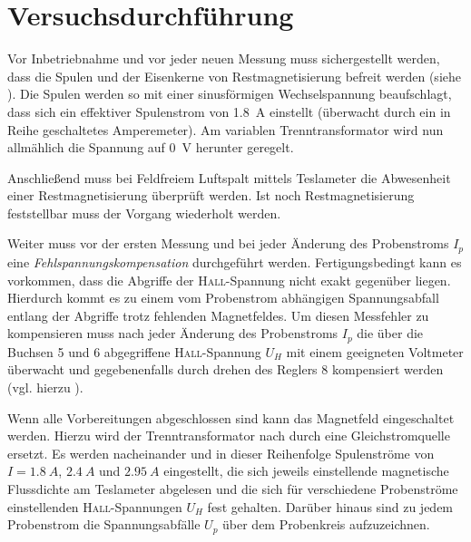 \chapter{Versuchsdurchführung}
Vor Inbetriebnahme und vor jeder neuen Messung muss sichergestellt werden, dass die Spulen und der Eisenkerne von
Restmagnetisierung befreit werden (siehe ). Die Spulen werden so mit einer sinusförmigen Wechselspannung beaufschlagt, dass sich
ein effektiver Spulenstrom von \SI{1,8}{A} einstellt (überwacht durch ein in Reihe geschaltetes Amperemeter). Am
variablen Trenntransformator wird nun allmählich die Spannung auf \SI{0}{V} herunter geregelt.
\par
Anschließend muss bei Feldfreiem Luftspalt mittels Teslameter die Abwesenheit einer Restmagnetisierung überprüft werden.
Ist noch Restmagnetisierung feststellbar muss der Vorgang wiederholt werden.
\par\medskip
Weiter muss vor der ersten Messung und bei jeder Änderung des Probenstroms \(I_p\) eine \textit{Fehlspannungskompensation}
durchgeführt werden. Fertigungsbedingt kann es vorkommen, dass die Abgriffe der \textsc{Hall}-Spannung nicht exakt gegenüber
liegen. Hierdurch kommt es zu einem vom Probenstrom abhängigen Spannungsabfall entlang der Abgriffe trotz fehlenden Magnetfeldes.
Um diesen Messfehler zu kompensieren muss nach jeder Änderung des Probenstroms \(I_p\) die über die Buchsen 5 und 6 abgegriffene
\textsc{Hall}-Spannung $U_H$ mit einem geeigneten Voltmeter überwacht und gegebenenfalls durch drehen des Reglers 8 kompensiert
werden (vgl. hierzu ).
\par\medskip
Wenn alle Vorbereitungen abgeschlossen sind kann das Magnetfeld eingeschaltet werden. Hierzu wird der Trenntransformator
nach  durch eine Gleichstromquelle ersetzt. Es werden nacheinander und in dieser Reihenfolge Spulenströme
von $I=\SI{1,8}{A}$, $\SI{2,4}{A}$ und $\SI{2,95}{A}$ eingestellt, die sich jeweils einstellende magnetische Flussdichte
am Teslameter abgelesen und die sich für verschiedene Probenströme einstellenden \textsc{Hall}-Spannungen $U_H$ fest gehalten.
Darüber hinaus sind zu jedem Probenstrom die Spannungsabfälle $U_p$ über dem Probenkreis aufzuzeichnen.